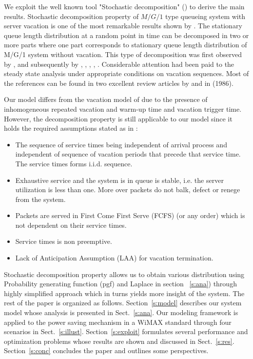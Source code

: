 \documentclass[journal]{IEEEtran}
\begin{document}
We exploit the well known tool "Stochastic decomposition" (\cite{Fuhrmann_Copper_1985}) to derive the main results.
Stochastic decomposition property of $M/G/1$ type queueing system with server vacation is one of the most remarkable results shown by \cite{Fuhrmann_Copper_1985}. The stationary queue length distribution at a random point in time can be decomposed in two or more parts where one part corresponds to stationary queue length distribution of M/G/1 system without vacation. This type of decomposition was first observed by \cite{Gaver_1962}, and subsequently by \cite{Miller_1964, Cooper_1970}, \cite{Levy_1975}, \cite{Shanthikumar_1980}, \cite{Scholl_Kleinrock_1983}, \cite{Ali_Neuts_1984}.
Considerable attention had been paid to the steady state analysis
under appropriate conditions on vacation sequences. Most of the
references can be found in two excellent review articles by
\cite{Doshi} and \cite{Teghem} in (1986).

Our model differs from the vacation model of \cite{Fuhrmann_Copper_1985}
due to the presence of inhomogeneous repeated vacation and warm-up time and vacation trigger time.
However, the decomposition property is still applicable to our
model since it holds the required assumptions stated
as in \cite{Shanthikumar}:
\begin{itemize}
\item The sequence of service times being independent of
arrival process and independent of sequence of vacation
periods that precede that service time. The service times
forms i.i.d. sequence.
\item Exhaustive service and the system is in queue is
stable, i.e. the server utilization is less than one.
More over packets do not balk, defect or renege from
the system.
\item Packets are served in First Come First Serve (FCFS) (or any order) which is
not dependent on their service times.
\item Service times is non preemptive.
\item Lack of Anticipation Assumption (LAA) for vacation termination.
\end{itemize}
Stochastic decomposition property allows us to obtain various
distribution using Probability generating function (pgf) and Laplace in section ~\ref{s:ana}) through highly
simplified approach which in turns yields more insight of the system.
The rest of the paper is organized as follows. Section~\ref{s:model}
describes our system model whose analysis is presented in
Sect.~\ref{s:ana}. Our modeling framework is applied to the power
saving mechanism in a WiMAX standard through four scenarios in
Sect.~\ref{s:illust}. Section~\ref{s:exploit} formulates several
performance and optimization problems whose results are shown and
discussed in Sect.~\ref{s:res}. Section~\ref{s:conc} concludes the
paper and outlines some perspectives.
\end{document}
